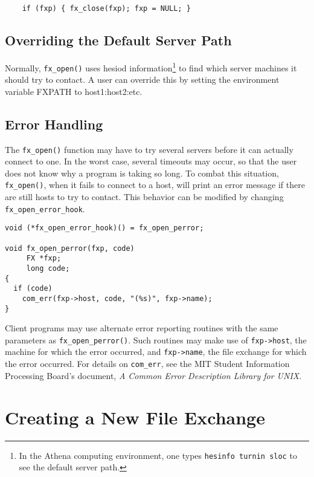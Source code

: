\begin{verbatim}
	if (fxp) { fx_close(fxp); fxp = NULL; }
\end{verbatim}

\subsection{Overriding the Default Server Path}

Normally, \verb+fx_open()+ uses hesiod information\footnote{In the
Athena computing environment, one types
\verb+hesinfo turnin sloc+ to see the default server path.} to find
which server machines it should try to contact.  A user can
override this by setting the environment variable FXPATH to
host1:host2:etc.

\subsection{Error Handling}

The \verb+fx_open()+ function may have to try several servers before it
can actually connect to one.  In the worst case, several timeouts may
occur, so that the user does not know why a program is taking so long.
To combat this situation, \verb+fx_open()+, when it fails to connect
to a host, will print an error message if there are still hosts to try
to contact. This behavior can be modified by changing
\verb+fx_open_error_hook+.

\begin{verbatim}
void (*fx_open_error_hook)() = fx_open_perror;

void fx_open_perror(fxp, code)
     FX *fxp;
     long code;
{
  if (code)
    com_err(fxp->host, code, "(%s)", fxp->name);
}

\end{verbatim}

Client programs may use alternate error reporting routines with the
same parameters as \verb+fx_open_perror()+.  Such routines may make
use of \verb+fxp->host+, the machine for which the error occurred, and
\verb+fxp->name+, the file exchange for which the error occurred.  For
details on \verb+com_err+, see the MIT Student Information Processing
Board's document, {\it A Common Error Description Library for UNIX}.

\pagebreak[3]

\section{Creating a New File Exchange}

